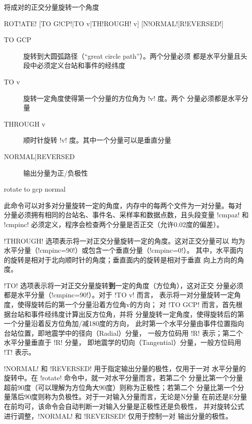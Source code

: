 \label{cmd:rotate}

将成对的正交分量旋转一个角度

\begin{SACSTX}
ROT!ATE! [TO G!CP!|TO v|TH!ROUGH! v] [N!ORMAL!|R!EVERSED!]
\end{SACSTX}

\begin{description}
\item [TO GCP] 旋转到大圆弧路径（``great circle path''）。两个分量必须
    都是水平分量且头段中必须定义台站和事件的经纬度
\item [TO v] 旋转一定角度使得第一个分量的方位角为 !v! 度。两个
    分量必须都是水平分量
\item [THROUGH v] 顺时针旋转 !v! 度。其中一个分量可以是垂直分量
\item [NORMAL|REVERSED] 输出分量为正/负极性
\end{description}

\begin{SACDFT}
rotate to gcp normal
\end{SACDFT}

此命令可以对多对分量旋转一定的角度，内存中的每两个文件为一对分量。每对
分量必须拥有相同的台站名、事件名、采样率和数据点数，且头段变量 !cmpaz!
和 !cmpinc! 必须定义，程序会检查两个分量是否正交（允许0.02度的偏差）。

!THROUGH! 选项表示将一对正交分量旋转一定的角度。这对正交分量可以
均为水平分量（!cmpinc=90!）或包含一个垂直分量（!cmpinc=0!）。
其中，水平面内的旋转是相对于北向顺时针的角度；垂直面内的旋转是相对于垂直
向上方向的角度。

!TO! 选项表示将一对正交分量旋转\textbf{到}一定的角度（方位角），这对正交
分量必须都是水平分量（!cmpinc=90!）。对于 !TO v! 而言，
表示将一对分量旋转一定角度，使得旋转后的第一个分量沿着方位角v的方向；
对 !TO GCP! 而言，首先根据台站和事件经纬度计算出反方位角，并将
分量旋转一定角度，使得旋转后的第一个分量沿着反方位角加/减180度的方向，
此时第一个水平分量由事件位置指向台站位置，即地震学中的径向（Radial）分量，
一般方位码用 !R! 表示；第二个水平分量垂直于 !R! 分量，
即地震学的切向（Tangential）分量，一般方位码用 !T! 表示。

!NORMAL! 和 !REVERSED! 用于指定输出分量的极性，仅用于一对
水平分量的旋转中。在 !rotate! 命令中，就一对水平分量而言，若第二个
分量比第一个分量超前90度（可以理解为方位角大90度）则称为正极性；若第二个
分量比第一个分量落后90度则称为负极性。对于一对输入分量而言，无论是N分量
在前还是E分量在前均可，该命令会自动判断一对输入分量是正极性还是负极性，
并对旋转公式进行调整，!NORMAL! 和 !REVERSED! 仅用于控制一对
输出分量的极性。

